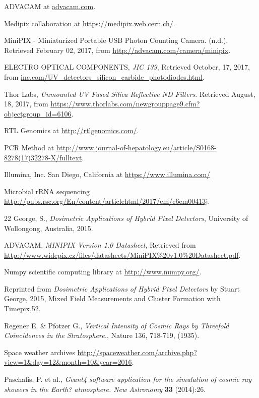 \begin{thebibliography}{9}
  ADVACAM at \url{advacam.com}.

  Medipix collaboration at \url{https://medipix.web.cern.ch/}.

  MiniPIX - Miniaturized Portable USB Photon Counting Camera. (n.d.). Retrieved February 02, 2017, from \url{http://advacam.com/camera/minipix}.

  ELECTRO OPTICAL COMPONENTS, \textit{JIC 139}, Retrieved October, 17, 2017, from \url{inc.com/UV_detectors_silicon_carbide_photodiodes.html}.

  Thor Labs, \textit{Unmounted UV Fused Silica Reflective ND Filters}. Retrieved August, 18, 2017, from \url{https://www.thorlabs.com/newgrouppage9.cfm?objectgroup_id=6106}.

  RTL Genomics at \url{http://rtlgenomics.com/}.

PCR Method at \url{http://www.journal-of-hepatology.eu/article/S0168-8278(17)32278-X/fulltext}.
	
	Illumina, Inc. San Diego, California at \url{https://www.illumina.com/}

Microbial rRNA sequencing \url{http://pubs.rsc.org/En/content/articlehtml/2017/em/c6em00413j}.
  
 22
  George, S., \textit{Dosimetric Applications of Hybrid Pixel Detectors}, University of Wollongong, Australia, 2015.

  ADVACAM, \textit{MINIPIX Version 1.0 Datasheet}, Retrieved from \url{http://www.widepix.cz/files/datasheets/MiniPIX\%20v1.0\%20Datasheet.pdf}.

  Numpy scientific computing library at \url{http://www.numpy.org/}.

	Reprinted from \textit{Dosimetric Applications of Hybrid Pixel Detectors} by Stuart George, 2015, Mixed Field Measurements and Cluster Formation with Timepix,52.

 Regener E. \& Pfotzer G., \textit{Vertical Intensity of Cosmic Rays by Threefold Coincidences in the Stratosphere.}, Nature 136, 718-719, (1935). 

Space weather archives \url{http://spaceweather.com/archive.php?view=1&day=12&month=10&year=2016}.

  Paschalis, P. et al., \textit{Geant4 software application for the simulation of cosmic ray showers in the Earth? atmosphere. New Astronomy} {\bf 33} (2014):26.


\end{thebibliography}
